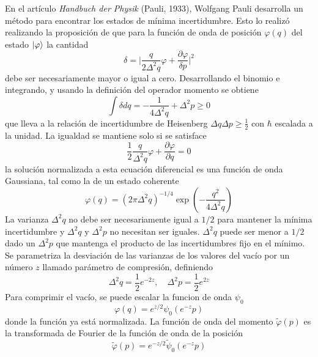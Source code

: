 En el artículo \textit{Handbuch der Physik} (Pauli, 1933), Wolfgang Pauli desarrolla un método para encontrar los estados de mínima incertidumbre. Esto lo realizó realizando la proposición de que para la función de onda de posición $\varphi(q)$ del estado $\ket{\varphi}$ la cantidad
\begin{equation*}
  \delta = \big| \frac{q }{2\Delta^2 q}\varphi + \frac{\partial \varphi}{\delta p} \big|^2
\end{equation*}
debe ser necesariamente mayor o igual a cero. Desarrollando el binomio e integrando, y usando la definición del operador momento se obtiene
\begin{equation*}
  \int \delta dq = -\frac{1}{4\Delta^2 q} + \Delta^2 p \geq 0
\end{equation*}
que lleva a la relación de incertidumbre de Heisenberg $\Delta q \Delta p \geq \frac{1}{2}$ con $\hbar$ escalada a la unidad. La igualdad se mantiene solo si se satisface
\begin{equation*}
  \frac{1}{2}\frac{q }{\Delta ^2 q} \varphi + \frac{\partial \varphi}{\partial q } = 0
\end{equation*}
la solución normalizada a esta ecuación diferencial es una función de onda Gaussiana, tal como la de un estado coherente
\begin{equation*}
  \varphi(q) = (2\pi\Delta^2q)^{-1/4}\exp{\left( -\frac{q^2}{4\Delta^2 q} \right)}
\end{equation*}
La varianza $\Delta^2 q$ no debe ser necesariamente igual a $1/2$ para mantener la mínima incertidumbre y $\Delta^2 q$ y $\Delta^2 p$ no necesitan ser iguales. $\Delta^2 q$ puede ser menor a $1/2$ dado un $\Delta^2 p$ que mantenga el producto de las incertidumbres fijo en el mínimo. Se parametriza la desviación de las varianzas de los valores del vacío por un número $z$ llamado parámetro de compresión, definiendo
\begin{equation*}
  \Delta^2 q = \frac{1}{2}e^{-2z}, \quad \Delta ^2 p = \frac{1}{2}e^{2z}
\end{equation*}
Para comprimir el vacío, se puede escalar la funcion de onda $\psi_0$
\begin{equation*}
  \varphi(q) = e^{z/2}\psi_0(e^{-z}p)
\end{equation*}
donde la función ya está normalizada. La función de onda del momento $\tilde{\varphi}(p)$ es la transformada de Fourier de la función de onda de la posición
\begin{equation*}
  \tilde{\varphi}(p) = e^{-z/2}\tilde{\psi}_0(e^{-z}p)
\end{equation*}
